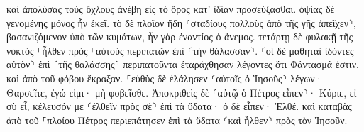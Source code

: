 \documentclass{openreader}
\begin{document}
καὶ ἀπολύσας τοὺς ὄχλους ἀνέβη εἰς τὸ ὄρος κατ’ ἰδίαν προσεύξασθαι. ὀψίας δὲ γενομένης μόνος ἦν ἐκεῖ. 
τὸ δὲ πλοῖον ἤδη ⸂σταδίους πολλοὺς ἀπὸ τῆς γῆς ἀπεῖχεν⸃, βασανιζόμενον ὑπὸ τῶν κυμάτων, ἦν γὰρ ἐναντίος ὁ ἄνεμος. 
τετάρτῃ δὲ φυλακῇ τῆς νυκτὸς ⸀ἦλθεν πρὸς ⸀αὐτοὺς περιπατῶν ἐπὶ ⸂τὴν θάλασσαν⸃. 
⸂οἱ δὲ μαθηταὶ ἰδόντες αὐτὸν⸃ ἐπὶ ⸂τῆς θαλάσσης⸃ περιπατοῦντα ἐταράχθησαν λέγοντες ὅτι Φάντασμά ἐστιν, καὶ ἀπὸ τοῦ φόβου ἔκραξαν. 
⸀εὐθὺς δὲ ἐλάλησεν ⸂αὐτοῖς ὁ Ἰησοῦς⸃ λέγων· Θαρσεῖτε, ἐγώ εἰμι· μὴ φοβεῖσθε. 
Ἀποκριθεὶς δὲ ⸂αὐτῷ ὁ Πέτρος εἶπεν⸃· Κύριε, εἰ σὺ εἶ, κέλευσόν με ⸂ἐλθεῖν πρὸς σὲ⸃ ἐπὶ τὰ ὕδατα· 
ὁ δὲ εἶπεν· Ἐλθέ. καὶ καταβὰς ἀπὸ τοῦ ⸀πλοίου Πέτρος περιεπάτησεν ἐπὶ τὰ ὕδατα ⸂καὶ ἦλθεν⸃ πρὸς τὸν Ἰησοῦν. 
\end{document}
